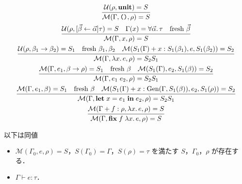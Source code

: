 \begin{gather*}
  \infer{\mathcal{M}(\Gamma, \text{\texttt{()}}, \rho) = S}{
    \mathcal{U}(\rho, \mathbf{unit}) = S
  }
  \\
  \infer{\mathcal{M}(\Gamma, x, \rho) = S}{
    \mathcal{U}(\rho, [\vec{\beta} \assign \vec{\alpha}]\tau) = S
    &
    \Gamma(x) = \forall \vec{\alpha}\ldotp \tau
    &
    \text{fresh $\vec{\beta}$}
  }
  \\
  \infer{\mathcal{M}(\Gamma, \lambda x\ldotp e, \rho) = S_2S_1}{
    \mathcal{U}(\rho, \beta_1 \to \beta_2) = S_1
    &
    \text{fresh $\beta_1, \beta_2$}
    &
    \mathcal{M}(S_1(\Gamma) + x:S_1(\beta_1), e, S_1(\beta_2)) = S_2
  }
  \\
  \infer{\mathcal{M}(\Gamma, e_1\;e_2, \rho) = S_2S_1}{
    \mathcal{M}(\Gamma, e_1, \beta \to \rho) = S_1
    &
    \text{fresh $\beta$}
    &
    \mathcal{M}(S_1(\Gamma), e_2, S_1(\beta)) = S_2
  }
  \\
  \infer{\mathcal{M}(\Gamma, \mathbf{let}\;x = e_1\;\mathbf{in}\;e_2, \rho) = S_2S_1}{
    \mathcal{M}(\Gamma, e_1, \beta) = S_1
    &
    \text{fresh $\beta$}
    &
    \mathcal{M}(S_1(\Gamma) + x:\mathrm{Gen}(\Gamma, S_1(\beta)), e_2, S_1(\rho)) = S_2
  }
  \\
  \infer{\mathcal{M}(\Gamma, \mathbf{fix}\;f\;\lambda x\ldotp e, \rho) = S}{
    \mathcal{M}(\Gamma + f:\rho, \lambda x\ldotp e, \rho) = S
  }
\end{gather*}

\begin{theorem}
  以下は同値
  \begin{itemize}
    \item $\mathcal{M}(\Gamma_0, e, \rho) = S$，$S(\Gamma_0) = \Gamma$，$S(\rho) = \tau$ を満たす $S$，$\Gamma_0$，$\rho$ が存在する．
    \item $\Gamma \vdash e: \tau$．
  \end{itemize}
\end{theorem}
